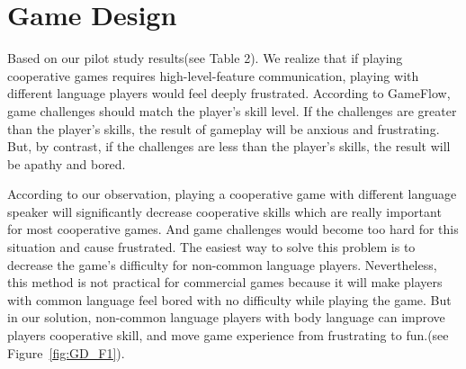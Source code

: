 \section{Game Design}


Based on our pilot study results(see Table 2). We realize that if playing cooperative games requires high-level-feature communication, playing with different language players would feel deeply frustrated. According to GameFlow\cite{GD1}, game challenges should match the player's skill level. If the challenges are greater than the player's skills, the result of gameplay will be anxious and frustrating. But, by contrast, if the challenges are less than the player's skills, the result will be apathy and bored.


According to our observation, playing a cooperative game with different language speaker will significantly decrease cooperative skills which are really important for most cooperative games. And game challenges would become too hard for this situation and cause frustrated. The easiest way to solve this problem is to decrease the game's difficulty for non-common language players. Nevertheless, this method is not practical for commercial games because it will make players with common language feel bored with no difficulty while playing the game. But in our solution, non-common language players with body language can improve players cooperative skill, and move game experience from frustrating to fun.(see Figure~\ref{fig:GD_F1}).  

